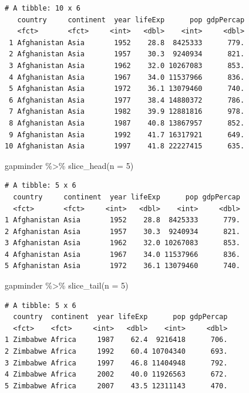 \documentclass[
  portuguese,
  letterpaper,
  DIV=11,
  numbers=noendperiod]{scrreprt}
\newenvironment{Shaded}{\begin{snugshade}}{\end{snugshade}}
\newcommand{\AttributeTok}[1]{\textcolor[rgb]{0.40,0.45,0.13}{#1}}
\newcommand{\DecValTok}[1]{\textcolor[rgb]{0.68,0.00,0.00}{#1}}
\newcommand{\FunctionTok}[1]{\textcolor[rgb]{0.28,0.35,0.67}{#1}}
\newcommand{\NormalTok}[1]{\textcolor[rgb]{0.00,0.23,0.31}{#1}}
\newcommand{\SpecialCharTok}[1]{\textcolor[rgb]{0.37,0.37,0.37}{#1}}
\theoremstyle{definition}
\theoremstyle{remark}
\begin{document}
\begin{verbatim}
# A tibble: 10 x 6
   country     continent  year lifeExp      pop gdpPercap
   <fct>       <fct>     <int>   <dbl>    <int>     <dbl>
 1 Afghanistan Asia       1952    28.8  8425333      779.
 2 Afghanistan Asia       1957    30.3  9240934      821.
 3 Afghanistan Asia       1962    32.0 10267083      853.
 4 Afghanistan Asia       1967    34.0 11537966      836.
 5 Afghanistan Asia       1972    36.1 13079460      740.
 6 Afghanistan Asia       1977    38.4 14880372      786.
 7 Afghanistan Asia       1982    39.9 12881816      978.
 8 Afghanistan Asia       1987    40.8 13867957      852.
 9 Afghanistan Asia       1992    41.7 16317921      649.
10 Afghanistan Asia       1997    41.8 22227415      635.
\end{verbatim}

\begin{Shaded}
\begin{Highlighting}[]
\NormalTok{gapminder }\SpecialCharTok{\%\textgreater{}\%} 
  \FunctionTok{slice\_head}\NormalTok{(}\AttributeTok{n =} \DecValTok{5}\NormalTok{)}
\end{Highlighting}
\end{Shaded}

\begin{verbatim}
# A tibble: 5 x 6
  country     continent  year lifeExp      pop gdpPercap
  <fct>       <fct>     <int>   <dbl>    <int>     <dbl>
1 Afghanistan Asia       1952    28.8  8425333      779.
2 Afghanistan Asia       1957    30.3  9240934      821.
3 Afghanistan Asia       1962    32.0 10267083      853.
4 Afghanistan Asia       1967    34.0 11537966      836.
5 Afghanistan Asia       1972    36.1 13079460      740.
\end{verbatim}

\begin{Shaded}
\begin{Highlighting}[]
\NormalTok{gapminder }\SpecialCharTok{\%\textgreater{}\%} 
  \FunctionTok{slice\_tail}\NormalTok{(}\AttributeTok{n =} \DecValTok{5}\NormalTok{)}
\end{Highlighting}
\end{Shaded}

\begin{verbatim}
# A tibble: 5 x 6
  country  continent  year lifeExp      pop gdpPercap
  <fct>    <fct>     <int>   <dbl>    <int>     <dbl>
1 Zimbabwe Africa     1987    62.4  9216418      706.
2 Zimbabwe Africa     1992    60.4 10704340      693.
3 Zimbabwe Africa     1997    46.8 11404948      792.
4 Zimbabwe Africa     2002    40.0 11926563      672.
5 Zimbabwe Africa     2007    43.5 12311143      470.
\end{verbatim}
\end{document}
